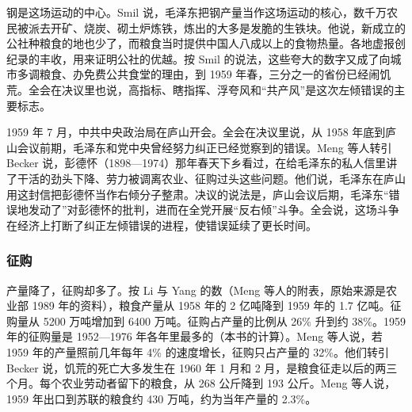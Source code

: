 钢是这场运动的中心。Smil 说，毛泽东把钢产量当作这场运动的核心，数千万农民被派去开矿、烧炭、砌土炉炼铁，炼出的大多是发脆的生铁块\cite{smil1999}。他说，新成立的公社种粮食的地也少了，而粮食当时提供中国人八成以上的食物热量\cite{smil1999}。各地虚报创纪录的丰收，用来证明公社的优越\cite{smil1999}。按 Smil 的说法，这些夸大的数字又成了向城市多调粮食、办免费公共食堂的理由，到 1959 年春，三分之一的省份已经闹饥荒\cite{smil1999}。全会在决议里也说，高指标、瞎指挥、浮夸风和“共产风”是这次左倾错误的主要标志\cite{res1981}。

1959 年 7 月，中共中央政治局在庐山开会。全会在决议里说，从 1958 年底到庐山会议前期，毛泽东和党中央曾经努力纠正已经觉察到的错误\cite{res1981}。Meng 等人转引 Becker 说，彭德怀（1898—1974）那年春天下乡看过，在给毛泽东的私人信里讲了干活的劲头下降、劳力被调离农业、征购过头这些问题\cite{mqy2010,loc43}。他们说，毛泽东在庐山用这封信把彭德怀当作右倾分子整肃\cite{mqy2010}。决议的说法是，庐山会议后期，毛泽东“错误地发动了”对彭德怀的批判，进而在全党开展“反右倾”斗争\cite{res1981}。全会说，这场斗争在经济上打断了纠正左倾错误的进程，使错误延续了更长时间\cite{res1981}。

\subsubsection{征购}

产量降了，征购却多了。按 Li 与 Yang 的数（Meng 等人的附表，原始来源是农业部 1989 年的资料），粮食产量从 1958 年的 2 亿吨降到 1959 年的 1.7 亿吨\cite{mqy2010}。征购量从 5200 万吨增加到 6400 万吨\cite{mqy2010}。征购占产量的比例从 26\% 升到约 38\%\cite{mqy2010}。1959 年的征购量是 1952—1976 年各年里最多的（本书的计算）。Meng 等人说，若 1959 年的产量照前几年每年 4\% 的速度增长，征购只占产量的 32\%\cite{mqy2010}。他们转引 Becker 说，饥荒的死亡大多发生在 1960 年 1 月和 2 月，是粮食征走以后的两三个月\cite{mqy2010}。每个农业劳动者留下的粮食，从 268 公斤降到 193 公斤\cite{mqy2010}。Meng 等人说，1959 年出口到苏联的粮食约 430 万吨，约为当年产量的 2.3\%\cite{mqy2010}。


